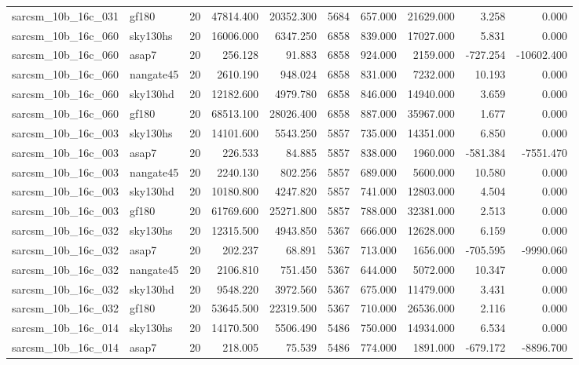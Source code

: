 \documentclass{article}
\begin{document}
\begin{longtable}{llrrrrrrrr}
sarcsm\_10b\_16c\_031 & gf180 & 20 & 47814.400 & 20352.300 & 5684 & 657.000 & 21629.000 & 3.258 & 0.000 \\
sarcsm\_10b\_16c\_060 & sky130hs & 20 & 16006.000 & 6347.250 & 6858 & 839.000 & 17027.000 & 5.831 & 0.000 \\
sarcsm\_10b\_16c\_060 & asap7 & 20 & 256.128 & 91.883 & 6858 & 924.000 & 2159.000 & -727.254 & -10602.400 \\
sarcsm\_10b\_16c\_060 & nangate45 & 20 & 2610.190 & 948.024 & 6858 & 831.000 & 7232.000 & 10.193 & 0.000 \\
sarcsm\_10b\_16c\_060 & sky130hd & 20 & 12182.600 & 4979.780 & 6858 & 846.000 & 14940.000 & 3.659 & 0.000 \\
sarcsm\_10b\_16c\_060 & gf180 & 20 & 68513.100 & 28026.400 & 6858 & 887.000 & 35967.000 & 1.677 & 0.000 \\
sarcsm\_10b\_16c\_003 & sky130hs & 20 & 14101.600 & 5543.250 & 5857 & 735.000 & 14351.000 & 6.850 & 0.000 \\
sarcsm\_10b\_16c\_003 & asap7 & 20 & 226.533 & 84.885 & 5857 & 838.000 & 1960.000 & -581.384 & -7551.470 \\
sarcsm\_10b\_16c\_003 & nangate45 & 20 & 2240.130 & 802.256 & 5857 & 689.000 & 5600.000 & 10.580 & 0.000 \\
sarcsm\_10b\_16c\_003 & sky130hd & 20 & 10180.800 & 4247.820 & 5857 & 741.000 & 12803.000 & 4.504 & 0.000 \\
sarcsm\_10b\_16c\_003 & gf180 & 20 & 61769.600 & 25271.800 & 5857 & 788.000 & 32381.000 & 2.513 & 0.000 \\
sarcsm\_10b\_16c\_032 & sky130hs & 20 & 12315.500 & 4943.850 & 5367 & 666.000 & 12628.000 & 6.159 & 0.000 \\
sarcsm\_10b\_16c\_032 & asap7 & 20 & 202.237 & 68.891 & 5367 & 713.000 & 1656.000 & -705.595 & -9990.060 \\
sarcsm\_10b\_16c\_032 & nangate45 & 20 & 2106.810 & 751.450 & 5367 & 644.000 & 5072.000 & 10.347 & 0.000 \\
sarcsm\_10b\_16c\_032 & sky130hd & 20 & 9548.220 & 3972.560 & 5367 & 675.000 & 11479.000 & 3.431 & 0.000 \\
sarcsm\_10b\_16c\_032 & gf180 & 20 & 53645.500 & 22319.500 & 5367 & 710.000 & 26536.000 & 2.116 & 0.000 \\
sarcsm\_10b\_16c\_014 & sky130hs & 20 & 14170.500 & 5506.490 & 5486 & 750.000 & 14934.000 & 6.534 & 0.000 \\
sarcsm\_10b\_16c\_014 & asap7 & 20 & 218.005 & 75.539 & 5486 & 774.000 & 1891.000 & -679.172 & -8896.700 \\

\end{longtable}
\end{document}
